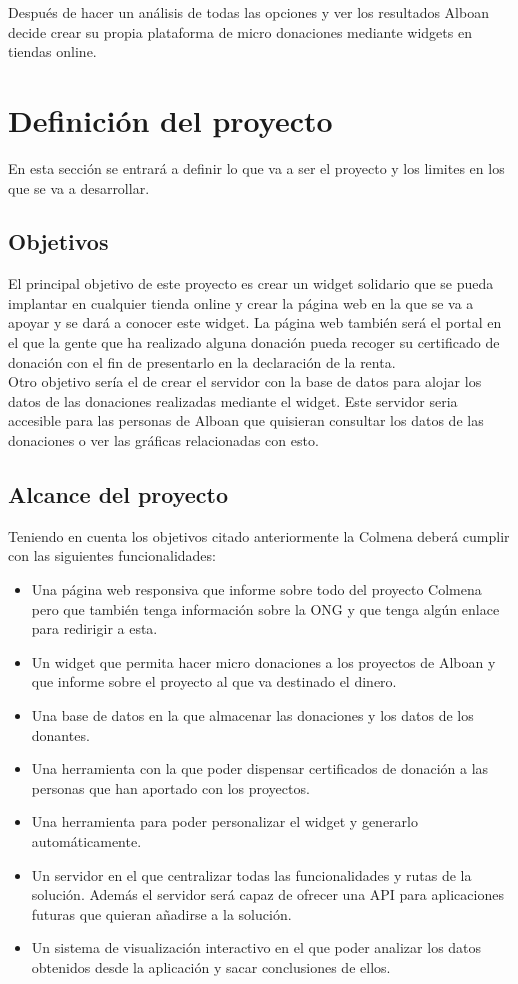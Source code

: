 Después de hacer un análisis de todas las opciones y ver los resultados Alboan decide crear su propia plataforma de micro donaciones mediante widgets en tiendas online.
				
\section{Definición del proyecto}
En esta sección se entrará a definir lo que va a ser el proyecto y los limites en los que se va a desarrollar.

\subsection{Objetivos}
El principal objetivo de este proyecto es crear un widget solidario que se pueda implantar en cualquier tienda online y crear la página web en la que se va a apoyar y se dará a conocer este widget. La página web también será el portal en el que la gente que ha realizado alguna donación pueda recoger su certificado de donación con el fin de presentarlo en la declaración de la renta.\\

Otro objetivo sería el de crear el servidor con la base de datos para alojar los datos de las donaciones realizadas mediante el widget. Este servidor seria accesible para las personas de Alboan que quisieran consultar los datos de las donaciones o ver las gráficas relacionadas con esto.

\subsection{Alcance del proyecto}
Teniendo en cuenta los objetivos citado anteriormente la Colmena deberá cumplir con las siguientes funcionalidades:

\begin{itemize}
	\item Una página web responsiva que informe sobre todo del proyecto Colmena pero que también tenga información sobre la ONG y que tenga algún enlace para redirigir a esta.
	\item Un widget que permita hacer micro donaciones a los proyectos de Alboan y que informe sobre el proyecto al que va destinado el dinero.
	\item Una base de datos en la que almacenar las donaciones y los datos de los donantes.
	\item Una herramienta con la que poder dispensar certificados de donación a las personas que han aportado con los proyectos.
	\item Una herramienta para poder personalizar el widget y generarlo automáticamente.
	\item Un servidor en el que centralizar todas las funcionalidades y rutas de la solución. Además el servidor será capaz de ofrecer una API para aplicaciones futuras que quieran añadirse a la solución.
	\item Un sistema de visualización interactivo en el que poder analizar los datos obtenidos desde la aplicación y sacar conclusiones de ellos.
\end{itemize}

